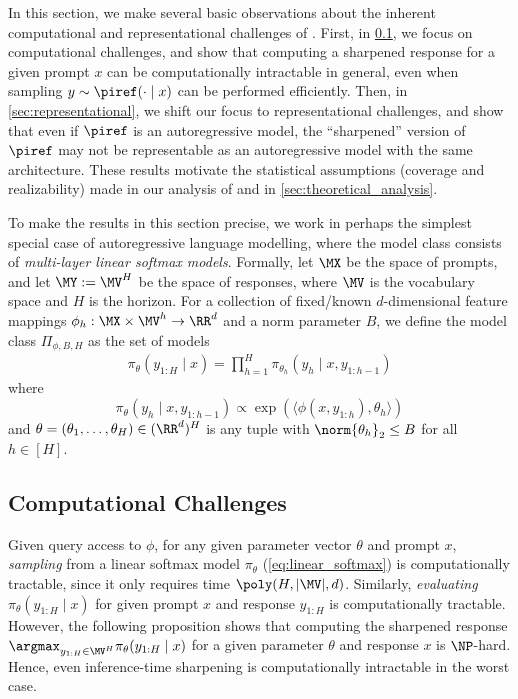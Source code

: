 In this section, we make several basic observations about the inherent computational and representational challenges of \mlsharp. First, in \cref{sec:computational}, we focus on computational challenges, and show that computing a sharpened response for a given prompt $x$ can be computationally intractable in general, even when sampling $y\sim\piref(\cdot\mid{}x)$ can be performed efficiently. Then, in \cref{sec:representational}, we shift our focus to representational challenges, and show that even if $\piref$ is an autoregressive model, the ``sharpened'' version of $\piref$ may not be representable as an autoregressive model with the same architecture. These results motivate the statistical assumptions (coverage and realizability) made in our analysis of \sftalg and \rlhfalg in \cref{sec:theoretical_analysis}.


To make the results in this section precise, we work in perhaps the simplest special case of autoregressive language modelling, where the model class consists of \emph{multi-layer linear softmax models}. Formally, let $\MX$ be the space of prompts, and let $\MY := \MV^H$ be the space of responses, where $\MV$ is the vocabulary space and $H$ is the horizon. For a collection of fixed/known $d$-dimensional feature mappings $\phi_h: \MX \times \MV^h \to \RR^d$ and a norm parameter $B$, we define the model class $\Pi_{\phi,B,H}$ as the set of models
\begin{align}
  \label{eq:linear_softmax}
\pi_\theta(y_{1:H}\mid{} x) = \prod_{h=1}^H \pi_{\theta_h}(y_h\mid{} x,y_{1:h-1})
\end{align}
where 
\[\pi_\theta(y_h\mid{} x,y_{1:h-1}) \propto \exp(\langle \phi(x,y_{1:h}), \theta_h\rangle)\]
and $\theta = (\theta_1,\dots,\theta_H) \in (\RR^d)^H$ is any tuple with $\norm{\theta_h}_2 \leq B$ for all $h \in [H]$.

\subsection{Computational Challenges}
\label{sec:computational}

Given query access to $\phi$, for any given parameter vector $\theta$ and prompt $x$, \emph{sampling} from a linear softmax model $\pi_\theta$ (\cref{eq:linear_softmax}) is computationally tractable, since it only requires time $\poly(H, |\MV|, d)$. Similarly, \emph{evaluating} $\pi_\theta(y_{1:H}\mid{} x)$ for given prompt $x$ and response $y_{1:H}$ is computationally tractable. %
However, the following proposition shows that computing the sharpened response $\argmax_{y_{1:H} \in \MV^H} \pi_\theta(y_{1:H}\mid{} x)$ for a given parameter $\theta$ and response $x$ is $\NP$-hard. Hence, even inference-time sharpening is computationally intractable in the worst case.

